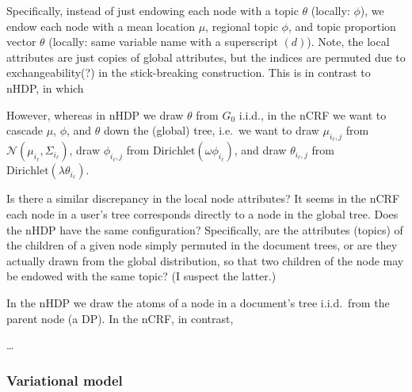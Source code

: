 \documentclass{article}
\newcommand{\Dirichlet}{\ensuremath{\mathrm{Dirichlet}}}
\newcommand{\Normal}{\ensuremath{\mathcal{N}}}
\begin{document}
Specifically, instead of just endowing each node with a topic $\theta$ (locally: $\phi$), we endow each node with a mean location $\mu$, regional topic $\phi$, and topic proportion vector $\theta$ (locally: same variable name with a superscript $(d)$).  Note, the local attributes are just copies of global attributes, but the indices are permuted due to exchangeability(?) in the stick-breaking construction.  This is in contrast to nHDP, in which

However, whereas in nHDP we draw $\theta$ from $G_0$ i.i.d., in the nCRF we want to cascade $\mu$, $\phi$, and $\theta$ down the (global) tree, i.e.\ we want to draw $\mu_{i_\ell,j}$ from $\Normal(\mu_{i_\ell}, \Sigma_{i_\ell})$, draw $\phi_{i_\ell,j}$ from $\Dirichlet(\omega \phi_{i_\ell})$, and draw $\theta_{i_\ell,j}$ from $\Dirichlet(\lambda \theta_{i_\ell})$.

Is there a similar discrepancy in the local node attributes?  It seems in the nCRF each node in a user's tree corresponds directly to a node in the global tree.  Does the nHDP have the same configuration?  Specifically, are the attributes (topics) of the children of a given node simply permuted in the document trees, or are they actually drawn from the global distribution, so that two children of the node may be endowed with the same topic?  (I suspect the latter.)

In the nHDP we draw the atoms of a node in a document's tree i.i.d.\ from the parent node (a DP).  In the nCRF, in contrast,

\ldots


\subsubsection*{Variational model}





\end{document}
